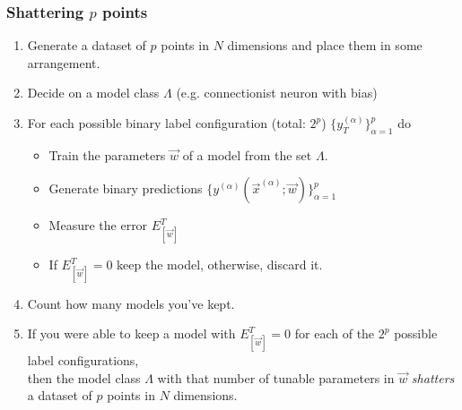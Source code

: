 \begin{frame}\frametitle{Shattering $p$ points}


\begin{enumerate}
\item Generate a dataset of $p$ points in $N$ dimensions and place them in some arrangement.
\pause
\item Decide on a model class $\Lambda$ (e.g. connectionist neuron with bias)
\pause
\item For each possible binary label configuration (total: $2^p$) $\{y_T^{(\alpha)}\}_{\alpha=1}^p$ do
	\begin{itemize}
	\item[] Train the parameters $\vec w$ of a model from the set $\Lambda$.
	\item[] Generate binary predictions $\{y^{(\alpha)}(\vec x^{(\alpha)}; \vec w)\}_{\alpha=1}^p$
	\item[] Measure the error $E^T_{[\vec w]}$
	\item[] If $E^T_{[\vec w]} = 0$ keep the model, otherwise, discard it. 
	\end{itemize}
\pause
\item Count how many models you've kept.\\
\pause
\item[] If you were able to keep a model with $E^T_{[\vec w]} = 0$ for each of the $2^p$ possible label configurations,\\
then the model class $\Lambda$ with that number of tunable parameters in $\vec w$ \emph{shatters} a dataset of $p$ points in $N$ dimensions.
\end{enumerate}

\end{frame}

